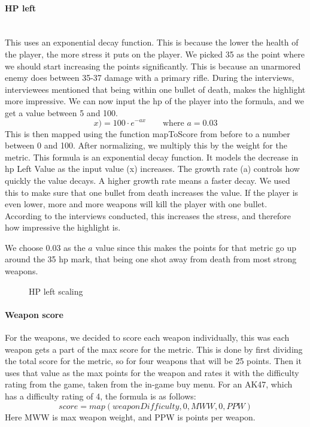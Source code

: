 \paragraph{HP left}\mbox{}\\

This uses an exponential decay function. This is because the lower the health of the player, the more stress it puts on the player. We picked 35 as the point where we should start increasing the points significantly. This is because an unarmored enemy does between 35-37 damage with a primary rifle. During the interviews, interviewees mentioned that being within one bullet of death, makes the highlight more impressive. We can now input the \acrshort{hp} of the player into the formula, and we get a value between 5 and 100.            
$$x) = 100 \cdot e^{-ax}  \qquad \text{where } a = 0.03$$
This is then mapped using the function mapToScore from before to a number between 0 and 100. After normalizing, we multiply this by the weight for the metric. 
This formula is an exponential decay function. It models the decrease in \acrshort{hp} Left Value as the input value (x) increases. The growth rate (a) controls how quickly the value decays. A higher growth rate means a faster decay. We used this to make sure that one bullet from death increases the value. If the player is even lower, more and more weapons will kill the player with one bullet. According to the interviews conducted, this increases the stress, and therefore how impressive the highlight is.

We choose 0.03 as the $a$ value since this makes the points for that metric go up around the 35 \acrshort{hp} mark, that being one shot away from death from most strong weapons.


\begin{figure}
    \centering
    \caption{HP left scaling}
    \label{fig:hp-left}
\end{figure}

\paragraph{Weapon score}
For the weapons, we decided to score each weapon individually, this was each weapon gets a part of the max score for the metric. This is done by first dividing the total score for the metric, so for four weapons that will be 25 points. Then it uses that value as the max points for the weapon and rates it with the difficulty rating from the game, taken from the in-game buy menu. For an AK47, which has a difficulty rating of 4, the formula is as follows: $$ score = map(weaponDifficulty, 0, MWW, 0, PPW) $$ Here MWW is max weapon weight, and PPW is points per weapon.


